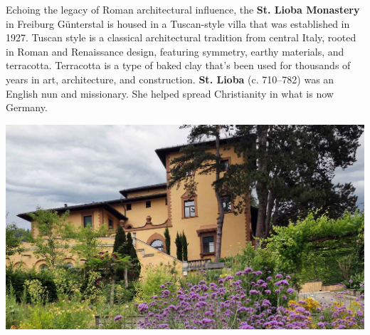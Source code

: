 \documentclass[landscape, a4paper]{article}
\newcommand\alert[1]{\textcolor{PrimaryColor}{\textbf{#1}}}
\begin{document}
\begin{minipage}[t]{0.31\textwidth}
  Echoing the legacy of Roman architectural influence, the \alert{St. Lioba Monastery} in Freiburg Günterstal is housed in a Tuscan-style villa that was established in 1927. Tuscan style is a classical architectural tradition from central Italy, rooted in Roman and Renaissance design, featuring symmetry, earthy materials, and terracotta. Terracotta is a type of baked clay that’s been used for thousands of years in art, architecture, and construction. \alert{St. Lioba} (c. 710–782) was an English nun and missionary. She helped spread Christianity in what is now Germany.



  \includegraphics[width=\linewidth]{./figures/kloster_st_lioba.png}
	\setlength{\parskip}{0.25cm}

\end{minipage}%
\end{document}
